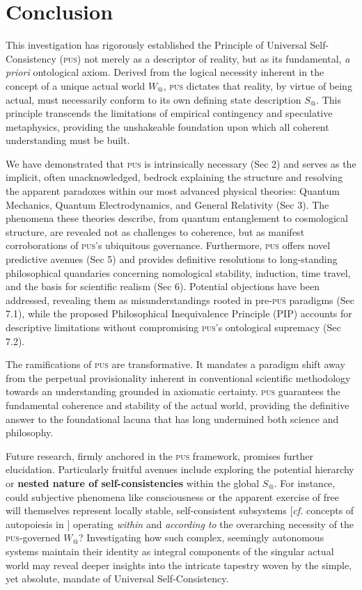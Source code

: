 \documentclass[11pt, a4paper]{article}
\makeatletter
\newcommand{\pus}{\textsc{pus}} %
\newcommand{\Wactual}{W_{@}} %
\newcommand{\Sactual}{S_{@}} %
\makeatother
\begin{document}
\section{Conclusion}
This investigation has rigorously established the Principle of Universal Self-Consistency (\pus) not merely as a descriptor of reality, but as its fundamental, \textit{a priori} ontological axiom. Derived from the logical necessity inherent in the concept of a unique actual world $\Wactual$, \pus{} dictates that reality, by virtue of being actual, must necessarily conform to its own defining state description $\Sactual$. This principle transcends the limitations of empirical contingency and speculative metaphysics, providing the unshakeable foundation upon which all coherent understanding must be built.

We have demonstrated that \pus{} is intrinsically necessary (Sec 2) and serves as the implicit, often unacknowledged, bedrock explaining the structure and resolving the apparent paradoxes within our most advanced physical theories: Quantum Mechanics, Quantum Electrodynamics, and General Relativity (Sec 3). The phenomena these theories describe, from quantum entanglement to cosmological structure, are revealed not as challenges to coherence, but as manifest corroborations of \pus's ubiquitous governance. Furthermore, \pus{} offers novel predictive avenues (Sec 5) and provides definitive resolutions to long-standing philosophical quandaries concerning nomological stability, induction, time travel, and the basis for scientific realism (Sec 6). Potential objections have been addressed, revealing them as misunderstandings rooted in pre-\pus{} paradigms (Sec 7.1), while the proposed Philosophical Inequivalence Principle (PIP) accounts for descriptive limitations without compromising \pus's ontological supremacy (Sec 7.2).

The ramifications of \pus{} are transformative. It mandates a paradigm shift away from the perpetual provisionality inherent in conventional scientific methodology towards an understanding grounded in axiomatic certainty. \pus{} guarantees the fundamental coherence and stability of the actual world, providing the definitive answer to the foundational lacuna that has long undermined both science and philosophy.

Future research, firmly anchored in the \pus{} framework, promises further elucidation. Particularly fruitful avenues include exploring the potential hierarchy or \textbf{nested nature of self-consistencies} within the global $\Sactual$. For instance, could subjective phenomena like consciousness or the apparent exercise of free will themselves represent locally stable, self-consistent subsystems [\textit{cf.} concepts of autopoiesis in \citealp{ Maturana1980}] operating \textit{within} and \textit{according to} the overarching necessity of the \pus-governed $\Wactual$? Investigating how such complex, seemingly autonomous systems maintain their identity as integral components of the singular actual world may reveal deeper insights into the intricate tapestry woven by the simple, yet absolute, mandate of Universal Self-Consistency.
\end{document}
